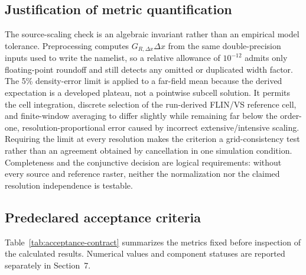 \subsection{Justification of metric quantification}

The source-scaling check is an algebraic invariant rather than an empirical
model tolerance.  Preprocessing computes \(G_{R,\Delta x}\Delta x\) from the
same double-precision inputs used to write the namelist, so a relative allowance
of \(10^{-12}\) admits only floating-point roundoff and still detects any omitted
or duplicated width factor.  The 5\% density-error limit is applied to a
far-field mean because the derived expectation is a developed plateau, not a
pointwise subcell solution.  It permits the cell integration, discrete selection
of the run-derived FLIN/VS reference cell, and finite-window averaging to differ
slightly while remaining far below the order-one, resolution-proportional error
caused by incorrect extensive/intensive scaling.  Requiring the limit at every
resolution makes the criterion a grid-consistency test rather than an agreement
obtained by cancellation in one simulation condition.  Completeness and the conjunctive
decision are logical requirements: without every source and reference raster,
neither the normalization nor the claimed resolution independence is testable.

\subsection{Predeclared acceptance criteria}

Table~\ref{tab:acceptance-contract} summarizes the metrics fixed before
inspection of the calculated results. Numerical values and component statuses
are reported separately in Section~7.

